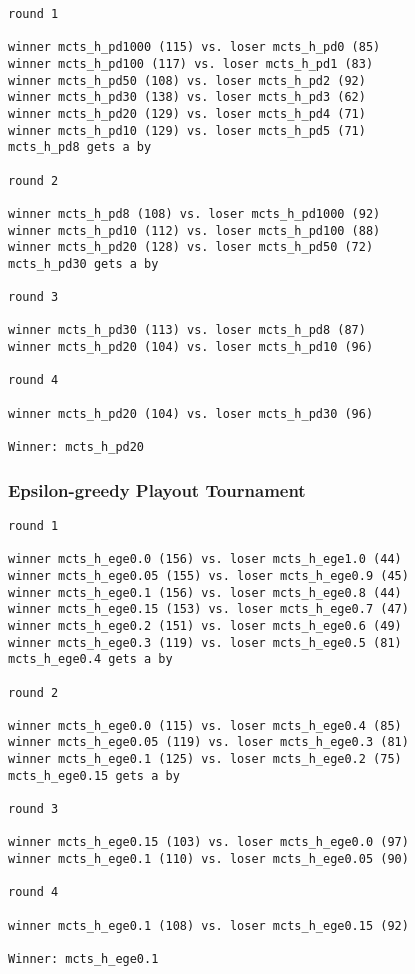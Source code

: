 \documentclass{article}
\begin{document}
\begin{verbatim}
round 1

winner mcts_h_pd1000 (115) vs. loser mcts_h_pd0 (85)
winner mcts_h_pd100 (117) vs. loser mcts_h_pd1 (83)
winner mcts_h_pd50 (108) vs. loser mcts_h_pd2 (92)
winner mcts_h_pd30 (138) vs. loser mcts_h_pd3 (62)
winner mcts_h_pd20 (129) vs. loser mcts_h_pd4 (71)
winner mcts_h_pd10 (129) vs. loser mcts_h_pd5 (71)
mcts_h_pd8 gets a by

round 2

winner mcts_h_pd8 (108) vs. loser mcts_h_pd1000 (92)
winner mcts_h_pd10 (112) vs. loser mcts_h_pd100 (88)
winner mcts_h_pd20 (128) vs. loser mcts_h_pd50 (72)
mcts_h_pd30 gets a by

round 3

winner mcts_h_pd30 (113) vs. loser mcts_h_pd8 (87)
winner mcts_h_pd20 (104) vs. loser mcts_h_pd10 (96)

round 4

winner mcts_h_pd20 (104) vs. loser mcts_h_pd30 (96)

Winner: mcts_h_pd20
\end{verbatim}

\subsubsection{Epsilon-greedy Playout Tournament}

\begin{verbatim}
round 1

winner mcts_h_ege0.0 (156) vs. loser mcts_h_ege1.0 (44)
winner mcts_h_ege0.05 (155) vs. loser mcts_h_ege0.9 (45)
winner mcts_h_ege0.1 (156) vs. loser mcts_h_ege0.8 (44)
winner mcts_h_ege0.15 (153) vs. loser mcts_h_ege0.7 (47)
winner mcts_h_ege0.2 (151) vs. loser mcts_h_ege0.6 (49)
winner mcts_h_ege0.3 (119) vs. loser mcts_h_ege0.5 (81)
mcts_h_ege0.4 gets a by

round 2

winner mcts_h_ege0.0 (115) vs. loser mcts_h_ege0.4 (85)
winner mcts_h_ege0.05 (119) vs. loser mcts_h_ege0.3 (81)
winner mcts_h_ege0.1 (125) vs. loser mcts_h_ege0.2 (75)
mcts_h_ege0.15 gets a by

round 3

winner mcts_h_ege0.15 (103) vs. loser mcts_h_ege0.0 (97)
winner mcts_h_ege0.1 (110) vs. loser mcts_h_ege0.05 (90)

round 4

winner mcts_h_ege0.1 (108) vs. loser mcts_h_ege0.15 (92)

Winner: mcts_h_ege0.1
\end{verbatim}
\end{document}
